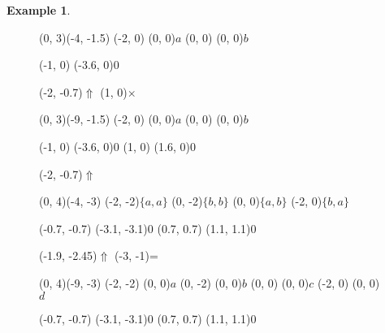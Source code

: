\documentclass{article}
\theoremstyle{definition}
\newtheorem{example}[theorem]{Example}
\begin{document}
\begin{example}
\begin{figure}[p]
\begin{graph}(0, 3)(-4, -1.5)
  (-2, 0) (0, 0){$a$}
  (0, 0)  (0, 0){$b$}

  (-1, 0) \freetext(-3.6, 0){0}
   
   

  \freetext(-2, -0.7){$\Uparrow$}
  \freetext(1, 0){$\times$}
\end{graph}
\begin{graph}(0, 3)(-9, -1.5)
  (-2, 0) (0, 0){$a$}
  (0, 0)  (0, 0){$b$}

  (-1, 0) \freetext(-3.6, 0){0}
   
   
  (1, 0) \freetext(1.6, 0){0}

  \freetext(-2, -0.7){$\Uparrow$}
\end{graph}

\begin{graph}(0, 4)(-4, -3)
  (-2, -2){$\{a, a\}$}
  (0, -2){$\{b, b\}$}
  (0, 0){$\{a, b\}$}
  (-2, 0){$\{b, a\}$}

  (-0.7, -0.7) \freetext(-3.1, -3.1){0}
   
   
  (0.7, 0.7) \freetext(1.1, 1.1){0}
   
   

  \freetext(-1.9, -2.45){$\Uparrow$}
  \freetext(-3, -1){=}
\end{graph}
\begin{graph}(0, 4)(-9, -3)
  (-2, -2) (0, 0){$a$}
  (0, -2)  (0, 0){$b$}
  (0, 0) (0, 0){$c$}
  (-2, 0)  (0, 0){$d$}

  (-0.7, -0.7) \freetext(-3.1, -3.1){0}
   
   
  (0.7, 0.7) \freetext(1.1, 1.1){0}
   
   


\end{graph}
\end{figure}
\end{example}
\end{document}
